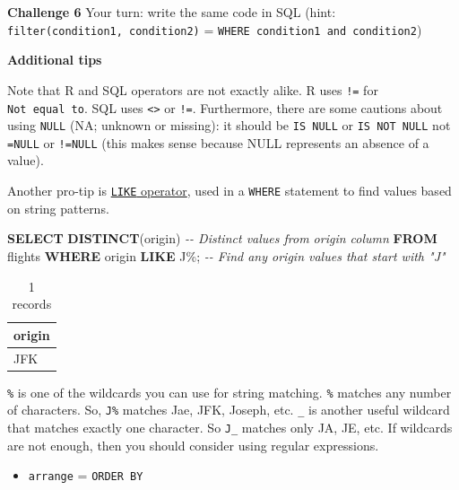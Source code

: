 \documentclass[
]{book}
\newenvironment{Shaded}{\begin{snugshade}}{\end{snugshade}}
\newcommand{\CommentTok}[1]{\textcolor[rgb]{0.56,0.35,0.01}{\textit{#1}}}
\newcommand{\KeywordTok}[1]{\textcolor[rgb]{0.13,0.29,0.53}{\textbf{#1}}}
\newcommand{\NormalTok}[1]{#1}
\newcommand{\StringTok}[1]{\textcolor[rgb]{0.31,0.60,0.02}{#1}}
\providecommand{\tightlist}{%
  \setlength{\itemsep}{0pt}\setlength{\parskip}{0pt}}
\begin{document}
\textbf{Challenge 6}
Your turn: write the same code in SQL (hint: \texttt{filter(condition1,\ condition2)} = \texttt{WHERE\ condition1\ and\ condition2})

\textbf{Additional tips}

Note that R and SQL operators are not exactly alike. R uses \texttt{!=} for \texttt{Not\ equal\ to}. SQL uses \texttt{\textless{}\textgreater{}} or \texttt{!=}. Furthermore, there are some cautions about using \texttt{NULL} (NA; unknown or missing): it should be \texttt{IS\ NULL} or \texttt{IS\ NOT\ NULL} not \texttt{=NULL} or \texttt{!=NULL} (this makes sense because NULL represents an absence of a value).

Another pro-tip is \href{https://www.w3schools.com/sql/sql_like.asp}{\texttt{LIKE} operator}, used in a \texttt{WHERE} statement to find values based on string patterns.

\begin{Shaded}
\begin{Highlighting}[]
\KeywordTok{SELECT} \KeywordTok{DISTINCT}\NormalTok{(origin) }\CommentTok{{-}{-} Distinct values from origin column}
\KeywordTok{FROM}\NormalTok{ flights}
\KeywordTok{WHERE}\NormalTok{ origin }\KeywordTok{LIKE} \StringTok{\textquotesingle{}J\%\textquotesingle{}}\NormalTok{; }\CommentTok{{-}{-} Find any origin values that start with "J"}
\end{Highlighting}
\end{Shaded}

\begin{table}

\caption{\label{tab:unnamed-chunk-16}1 records}
\centering
\begin{tabular}[t]{l}
\hline
origin\\
\hline
JFK\\
\hline
\end{tabular}
\end{table}

\texttt{\%} is one of the wildcards you can use for string matching. \texttt{\%} matches any number of characters. So, \texttt{J\%} matches Jae, JFK, Joseph, etc. \texttt{\_} is another useful wildcard that matches exactly one character. So \texttt{J\_} matches only JA, JE, etc. If wildcards are not enough, then you should consider using regular expressions.

\begin{itemize}
\tightlist
\item
  \texttt{arrange} = \texttt{ORDER\ BY}
\end{itemize}
\end{document}
